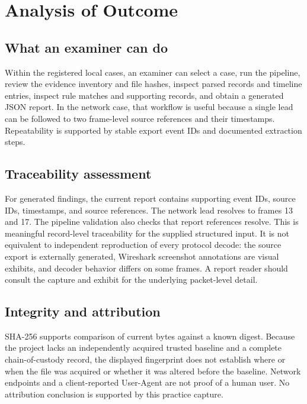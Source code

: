 \documentclass[12pt,a4paper]{report}
\begin{document}
\chapter{Analysis of Outcome}
\section{What an examiner can do}
Within the registered local cases, an examiner can select a case, run the pipeline, review the evidence inventory and file hashes, inspect parsed records and timeline entries, inspect rule matches and supporting records, and obtain a generated JSON report. In the network case, that workflow is useful because a single lead can be followed to two frame-level source references and their timestamps. Repeatability is supported by stable export event IDs and documented extraction steps.

\section{Traceability assessment}
For generated findings, the current report contains supporting event IDs, source IDs, timestamps, and source references. The network lead resolves to frames 13 and 17. The pipeline validation also checks that report references resolve. This is meaningful record-level traceability for the supplied structured input. It is not equivalent to independent reproduction of every protocol decode: the source export is externally generated, Wireshark screenshot annotations are visual exhibits, and decoder behavior differs on some frames. A report reader should consult the capture and exhibit for the underlying packet-level detail.

\section{Integrity and attribution}
SHA-256 supports comparison of current bytes against a known digest. Because the project lacks an independently acquired trusted baseline and a complete chain-of-custody record, the displayed fingerprint does not establish where or when the file was acquired or whether it was altered before the baseline. Network endpoints and a client-reported User-Agent are not proof of a human user. No attribution conclusion is supported by this practice capture.
\end{document}
